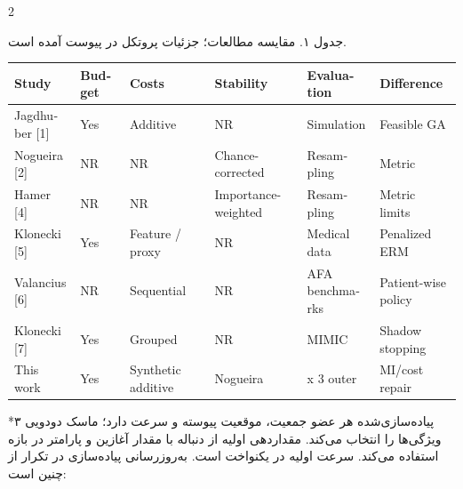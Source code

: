 \documentclass[10pt,a4paper]{article}
\makeatletter
\renewcommand{\section}{\@startsection{section}{1}{0pt}{5pt}{2pt}{\normalfont\normalsize\bfseries}}
\newcommand{\sect}[1]{\section*{#1}}
\makeatother
\begin{document}
\begin{multicols}{2}
\par\vspace{3pt}\begin{minipage}{\linewidth}{\footnotesize جدول ۱. مقایسه مطالعات؛ جزئیات پروتکل در پیوست آمده است.\par}
\begin{latin}
{\fontsize{6.8}{8.3}\selectfont\setlength{\tabcolsep}{2pt}\renewcommand{\arraystretch}{1.1}
\begin{tabularx}{\linewidth}{>{\hsize=1.0000\hsize\raggedright\arraybackslash}X>{\hsize=1.0000\hsize\raggedright\arraybackslash}X>{\hsize=1.0000\hsize\raggedright\arraybackslash}X>{\hsize=1.0000\hsize\raggedright\arraybackslash}X>{\hsize=1.0000\hsize\raggedright\arraybackslash}X>{\hsize=1.0000\hsize\raggedright\arraybackslash}X}\toprule
Study & Budget & Costs & Stability & Evaluation & Difference\\\midrule
Jagdhuber [1] & Yes & Additive & NR & Simulation & Feasible GA\\
Nogueira [2] & NR & NR & Chance-corrected & Resampling & Metric\\
Hamer [4] & NR & NR & Importance-weighted & Resampling & Metric limits\\
Klonecki [5] & Yes & Feature / proxy & NR & Medical data & Penalized ERM\\
Valancius [6] & NR & Sequential & NR & AFA benchmarks & Patient-wise policy\\
Klonecki [7] & Yes & Grouped & NR & MIMIC & Shadow stopping\\
This work & Yes & Synthetic additive & Nogueira & 2 x 3 outer & MI/cost repair\\
\bottomrule\end{tabularx}}
\end{latin}
\end{minipage}\par\vspace{3pt}
\sect{۳   پیاده‌سازی‌شده}
هر عضو جمعیت، موقعیت پیوسته  و سرعت  دارد؛ ماسک دودویی  ویژگی‌ها را انتخاب می‌کند. مقداردهی اولیه از دنباله  با مقدار آغازین  و پارامتر  در بازه \lr{[-6,6]} استفاده می‌کند. سرعت اولیه در \lr{[-1.2,1.2]} یکنواخت است. به‌روزرسانی پیاده‌سازی در تکرار  از  چنین است:


\end{multicols}
\end{document}

